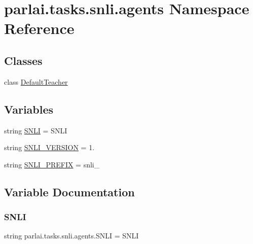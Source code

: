 \hypertarget{namespaceparlai_1_1tasks_1_1snli_1_1agents}{}\section{parlai.\+tasks.\+snli.\+agents Namespace Reference}
\label{namespaceparlai_1_1tasks_1_1snli_1_1agents}
\subsection*{Classes}
\begin{DoxyCompactItemize}
\item 
class \hyperlink{classparlai_1_1tasks_1_1snli_1_1agents_1_1DefaultTeacher}{Default\+Teacher}
\end{DoxyCompactItemize}
\subsection*{Variables}
\begin{DoxyCompactItemize}
\item 
string \hyperlink{namespaceparlai_1_1tasks_1_1snli_1_1agents_afad193b17008c0c816889726f837d488}{S\+N\+LI} = \textquotesingle{}S\+N\+LI\textquotesingle{}
\item 
string \hyperlink{namespaceparlai_1_1tasks_1_1snli_1_1agents_a3e12ae80ce316a320ad488a4f50cce28}{S\+N\+L\+I\+\_\+\+V\+E\+R\+S\+I\+ON} = \textquotesingle{}1.\textquotesingle{}
\item 
string \hyperlink{namespaceparlai_1_1tasks_1_1snli_1_1agents_a2df5af73bd9e97c56fb9a08b4a22ecef}{S\+N\+L\+I\+\_\+\+P\+R\+E\+F\+IX} = \textquotesingle{}snli\+\_\+\textquotesingle{}
\end{DoxyCompactItemize}


\subsection{Variable Documentation}
\mbox{\label{namespaceparlai_1_1tasks_1_1snli_1_1agents_afad193b17008c0c816889726f837d488}} 
\subsubsection{\texorpdfstring{S\+N\+LI}{SNLI}}
{\footnotesize\ttfamily string parlai.\+tasks.\+snli.\+agents.\+S\+N\+LI = \textquotesingle{}S\+N\+LI\textquotesingle{}}

